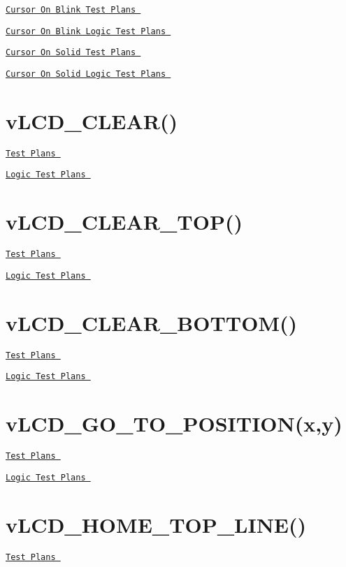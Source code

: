  \href{vLCD_ON_OFF_CURSOR_ON_BLINK_TESTPLAN.pdf}{\tt Cursor On Blink Test Plans } \par
 \href{vLCD_ON_OFF_CURSOR_ON_BLINK_LOGIC.pdf}{\tt Cursor On Blink Logic Test Plans } \par
 \href{vLCD_ON_OFF_CURSOR_ON_SOLID_TESTPLAN.pdf}{\tt Cursor On Solid Test Plans } \par
 \href{vLCD_ON_OFF_CURSOR_ON_SOLID_LOGIC.pdf}{\tt Cursor On Solid Logic Test Plans }\hypertarget{_test_plans_clear}{}\section{v\-L\-C\-D\-\_\-\-C\-L\-E\-A\-R()}\label{_test_plans_clear}
\href{vLCD_CLEAR_TESTPLAN.pdf}{\tt Test Plans } \par
 \href{vLCD_CLEAR_LOGIC.pdf}{\tt Logic Test Plans }\hypertarget{_test_plans_clear_top}{}\section{v\-L\-C\-D\-\_\-\-C\-L\-E\-A\-R\-\_\-\-T\-O\-P()}\label{_test_plans_clear_top}
\href{vLCD_CLEAR_TOP_TESTPLAN.pdf}{\tt Test Plans } \par
 \href{vLCD_CLEAR_TOP_LOGIC.pdf}{\tt Logic Test Plans }\hypertarget{_test_plans_clear_bottom}{}\section{v\-L\-C\-D\-\_\-\-C\-L\-E\-A\-R\-\_\-\-B\-O\-T\-T\-O\-M()}\label{_test_plans_clear_bottom}
\href{vLCD_CLEAR_BOTTOM_TESTPLAN.pdf}{\tt Test Plans } \par
 \href{vLCD_CLEAR_BOTTOM_LOGIC.pdf}{\tt Logic Test Plans }\hypertarget{_test_plans_position}{}\section{v\-L\-C\-D\-\_\-\-G\-O\-\_\-\-T\-O\-\_\-\-P\-O\-S\-I\-T\-I\-O\-N(x,y)}\label{_test_plans_position}
\href{vLCD_GO_TO_POSITION_TESTPLAN.pdf}{\tt Test Plans } \par
 \href{vLCD_GO_TO_POSITION_LOGIC.pdf}{\tt Logic Test Plans }\hypertarget{_test_plans_tophome}{}\section{v\-L\-C\-D\-\_\-\-H\-O\-M\-E\-\_\-\-T\-O\-P\-\_\-\-L\-I\-N\-E()}\label{_test_plans_tophome}
\href{vLCD_HOME_TOP_LINE_TESTPLAN.pdf}{\tt Test Plans } \par
